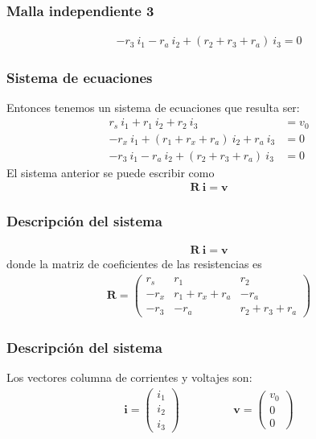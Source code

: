 \begin{frame}[fragile]
\frametitle{Malla independiente 3}
\begin{figure}
	\centering
	
\end{figure}
\begin{align*}
-r_{3} \: i_{1} - r_{a} \: i_{2} + ( r_{2} + r_{3} + r_{a}) \: i_{3} = 0
\end{align*}
\end{frame}
\begin{frame}
\frametitle{Sistema de ecuaciones}
Entonces tenemos un sistema de ecuaciones que resulta ser:
\begin{align*}
r_{s} \: i_{1} + r_{1} \: i_{2} + r_{2} \: i_{3} &= v_{0} \\
-r_{x} \: i_{1} + (r_{1} + r_{x} + r_{a}) \: i_{2} + r_{a} \: i_{3} &= 0 \\
-r_{3} \: i_{1} - r_{a} \: i_{2} + (r_{2} + r_{3} + r_{a}) \: i_{3} &= 0
\end{align*}
\pause
El sistema anterior se puede escribir como
\begin{align*}
\mathbf{R \: i} = \mathbf{v}
\end{align*}
\end{frame}
\begin{frame}
\frametitle{Descripción del sistema}
\begin{align*}
\mathbf{R \: i} = \mathbf{v}
\end{align*}
donde la matriz de coeficientes de las resistencias es
\begin{align*}
\mathbf{R} =
\begin{pmatrix}
r_{s} & r_{1} & r_{2} \\
-r_{x} & r_{1} + r_{x} + r_{a} & -r_{a} \\
-r_{3} & -r_{a} & r_{2} + r_{3} + r_{a}
\end{pmatrix}
\end{align*}
\end{frame}
\begin{frame}
\frametitle{Descripción del sistema}
Los vectores columna de corrientes y voltajes son:
\begin{align*}
\mathbf{i} =
\begin{pmatrix}
i_{1} \\
i_{2} \\
i_{3}
\end{pmatrix}
\hspace{2cm}
\mathbf{v} =
\begin{pmatrix}
v_{0} \\
0 \\
0
\end{pmatrix}
\end{align*}
\end{frame}

